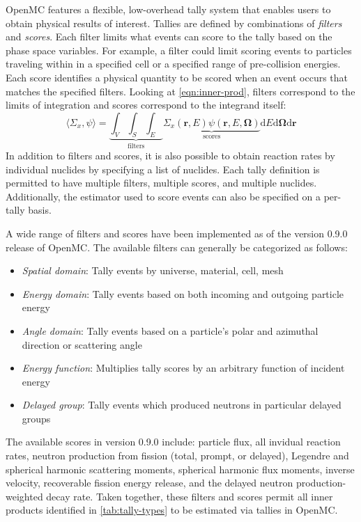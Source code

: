 OpenMC features a flexible, low-overhead tally system that enables users to obtain physical results of interest. Tallies are defined by combinations of \emph{filters} and \emph{scores}. Each filter limits what events can score to the tally based on the phase space variables. For example, a filter could limit scoring events to particles traveling within in a specified cell or a specified range of pre-collision energies. Each score identifies a physical quantity to be scored when an event occurs that matches the specified filters. Looking at \cref{eqn:inner-prod}, filters correspond to the limits of integration and scores correspond to the integrand itself:
\begin{equation}
\langle \Sigma_x, \psi \rangle = \underbrace{\int_{V} \int_{S} \int_{E}}_{\text{filters}} \underbrace{\Sigma_{x}(\mathbf{r},E)\psi(\mathbf{r},E,\mathbf{\Omega})}_{\text{scores}} \mathrm{d}E\mathrm{d}\mathbf{\Omega}\mathrm{d}\mathbf{r}
\end{equation}
In addition to filters and scores, it is also possible to obtain reaction rates by individual nuclides by specifying a list of nuclides. Each tally definition is permitted to have multiple filters, multiple scores, and multiple nuclides. Additionally, the estimator used to score events can also be specified on a per-tally basis.

A wide range of filters and scores have been implemented as of the version 0.9.0 release of OpenMC\cite{openmc-090}. The available filters can generally be categorized as follows:
\begin{itemize}[noitemsep]
\item \emph{Spatial domain}: Tally events by universe, material, cell, mesh
\item \emph{Energy domain}: Tally events based on both incoming and outgoing particle energy
\item \emph{Angle domain}: Tally events based on a particle's polar and azimuthal direction or scattering angle
\item \emph{Energy function}: Multiplies tally scores by an arbitrary function of incident energy
\item \emph{Delayed group}: Tally events which produced neutrons in particular delayed groups
\end{itemize}
The available scores in version 0.9.0 include: particle flux, all invidual reaction rates, neutron production from fission (total, prompt, or delayed), Legendre and spherical harmonic scattering moments, spherical harmonic flux moments, inverse velocity, recoverable fission energy release, and the delayed neutron production-weighted decay rate. Taken together, these filters and scores permit all inner products identified in \cref{tab:tally-types} to be estimated via tallies in OpenMC.

